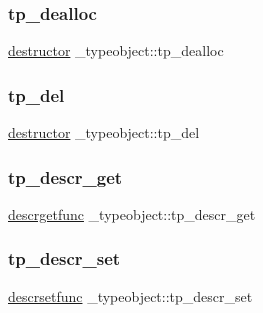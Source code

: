 \mbox{\label{struct__typeobject_a340396d33c324118bdda0a521bf235fb}} 
\subsubsection{\texorpdfstring{tp\_dealloc}{tp\_dealloc}}
{\footnotesize\ttfamily \mbox{\hyperlink{pycapsule_8h_a51509651aa95ca080a474808eb5c8544}{destructor}} \+\_\+typeobject\+::tp\+\_\+dealloc}

\mbox{\label{struct__typeobject_aff367b8344e94586326576ec274b625d}} 
\subsubsection{\texorpdfstring{tp\_del}{tp\_del}}
{\footnotesize\ttfamily \mbox{\hyperlink{pycapsule_8h_a51509651aa95ca080a474808eb5c8544}{destructor}} \+\_\+typeobject\+::tp\+\_\+del}

\mbox{\label{struct__typeobject_a3ff32e22578c07e795f15e2e58b3c657}} 
\subsubsection{\texorpdfstring{tp\_descr\_get}{tp\_descr\_get}}
{\footnotesize\ttfamily \mbox{\hyperlink{_python27_2object_8h_a9283a02147f2d97fda7482ba19752aef}{descrgetfunc}} \+\_\+typeobject\+::tp\+\_\+descr\+\_\+get}

\mbox{\label{struct__typeobject_a19a6249b18199f7ebdb3635e0340f53d}} 
\subsubsection{\texorpdfstring{tp\_descr\_set}{tp\_descr\_set}}
{\footnotesize\ttfamily \mbox{\hyperlink{_python27_2object_8h_a9f1205e9e20d651607277c88b9a4953f}{descrsetfunc}} \+\_\+typeobject\+::tp\+\_\+descr\+\_\+set}

